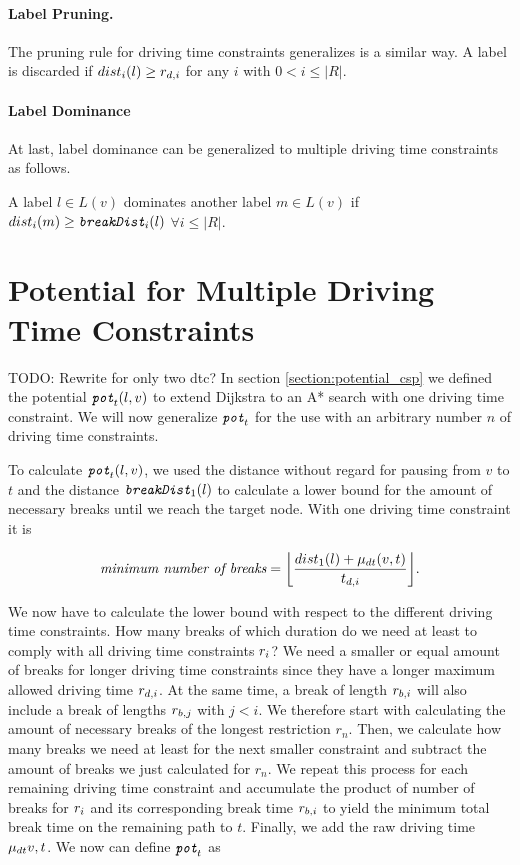 \paragraph{Label Pruning.}
The pruning rule for driving time constraints generalizes is a similar way. A label is discarded if $dist_i(l) \ge r_{d,i}$ for any $i$ with $0 < i \le |R|$.


\paragraph{Label Dominance}
At last, label dominance can be generalized to multiple driving time constraints as follows.
\begin{definition}
	A label $l \in L(v)$ dominates another label $m \in L(v)$ if $dist_i(m) \ge \texttt{\itshape breakDist}_i(l)$ $\forall i \le |R|$.
\end{definition}

\section{Potential for Multiple Driving Time Constraints\label{section:potential_n_csp}}
TODO: Rewrite for only two dtc?
In section \ref{section:potential_csp} we defined the potential $\texttt{\itshape pot}_t(l,v)$ to extend Dijkstra to an A* search with one driving time constraint. We will now generalize $\texttt{\itshape pot}_t$ for the use with an arbitrary number $n$ of driving time constraints.

To calculate $\texttt{\itshape pot}_t(l,v)$, we used the distance without regard for pausing from $v$ to $t$ and the distance $\texttt{\itshape breakDist}_1(l)$ to calculate a lower bound for the amount of necessary breaks until we reach the target node. With one driving time constraint it is

\[\textit{minimum number of breaks} = \floor*{ \frac{dist_{1}(l) + \drivingtime(v,t)}{t_{d,i}} }.\]

We now have to calculate the lower bound with respect to the different driving time constraints. How many breaks of which duration do we need at least to comply with all driving time constraints $r_i$? We need a smaller or equal amount of breaks for longer driving time constraints since they have a longer maximum allowed driving time $r_{d,i}$. At the same time, a break of length $r_{b,i}$ will also include a break of lengths $r_{b,j}$ with $j < i$. We therefore start with calculating the amount of necessary breaks of the longest restriction $r_n$. Then, we calculate how many breaks we need at least for the next smaller constraint and subtract the amount of breaks we just calculated for $r_n$. We repeat this process for each remaining driving time constraint and accumulate the product of number of breaks for $r_i$ and its corresponding break time $r_{b,i}$ to yield the minimum total break time on the remaining path to $t$. Finally, we add the raw driving time $\mu_{dt}{v,t}$. We now can define $\texttt{\itshape pot}_t$ as

